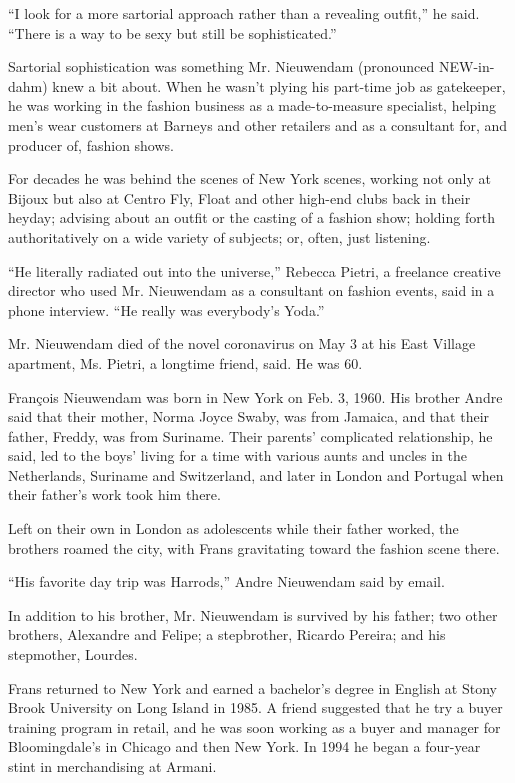 ``I look for a more sartorial approach rather than a revealing outfit,''
he said. ``There is a way to be sexy but still be sophisticated.''

Sartorial sophistication was something Mr. Nieuwendam (pronounced
NEW-in-dahm) knew a bit about. When he wasn't plying his part-time job
as gatekeeper, he was working in the fashion business as a
made-to-measure specialist, helping men's wear customers at Barneys and
other retailers and as a consultant for, and producer of, fashion shows.

For decades he was behind the scenes of New York scenes, working not
only at Bijoux but also at Centro Fly, Float and other high-end clubs
back in their heyday; advising about an outfit or the casting of a
fashion show; holding forth authoritatively on a wide variety of
subjects; or, often, just listening.

``He literally radiated out into the universe,'' Rebecca Pietri, a
freelance creative director who used Mr. Nieuwendam as a consultant on
fashion events, said in a phone interview. ``He really was everybody's
Yoda.''

Mr. Nieuwendam died of the novel coronavirus on May 3 at his East
Village apartment, Ms. Pietri, a longtime friend, said. He was 60.

François Nieuwendam was born in New York on Feb. 3, 1960. His brother
Andre said that their mother, Norma Joyce Swaby, was from Jamaica, and
that their father, Freddy, was from Suriname. Their parents' complicated
relationship, he said, led to the boys' living for a time with various
aunts and uncles in the Netherlands, Suriname and Switzerland, and later
in London and Portugal when their father's work took him there.

Left on their own in London as adolescents while their father worked,
the brothers roamed the city, with Frans gravitating toward the fashion
scene there.

``His favorite day trip was Harrods,'' Andre Nieuwendam said by email.

In addition to his brother, Mr. Nieuwendam is survived by his father;
two other brothers, Alexandre and Felipe; a stepbrother, Ricardo
Pereira; and his stepmother, Lourdes.

Frans returned to New York and earned a bachelor's degree in English at
Stony Brook University on Long Island in 1985. A friend suggested that
he try a buyer training program in retail, and he was soon working as a
buyer and manager for Bloomingdale's in Chicago and then New York. In
1994 he began a four-year stint in merchandising at Armani.


